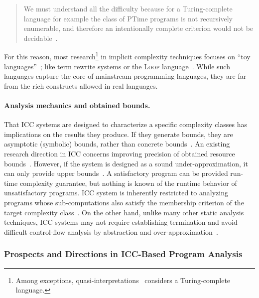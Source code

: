 \begin{quotation}
\noindent We must understand all the diﬃculty because for a Turing-complete language for example the class of PTime programs is not recursively enumerable, and therefore an intentionally complete criterion would not be decidable~\cite[Sect. 4.1]{mogbil2012}.
\end{quotation}

\noindent For this reason, most research\footnote{
Among exceptions, quasi-interpretations~\cite{marion2000} considers a Turing-complete language.}
in implicit complexity techniques focuses on \enquote{toy languages}~\cite{moyen2017,rubiano17};
like term rewrite systems or the \textsc{Loop} language~\cite{kristiansen2005}.
While such languages capture the core of mainstream programming languages, they are far from the rich constructs allowed in real languages.

\paragraph*{Analysis mechanics and obtained bounds.}
That ICC systems are designed to characterize a specific complexity classes has implications on the results they produce.
If they generate bounds, they are asymptotic (symbolic) bounds, rather than concrete bounds~\cite{baillot2019}.
An existing research direction in ICC concerns improving precision of obtained resource bounds~\cite{benamram2020}.
However, if the system is designed as a sound under-approximation, it can only provide upper bounds~\cite[p. 119]{moyen2017}.
A satisfactory program can be provided run-time complexity guarantee, but nothing is known of the runtime behavior of unsatisfactory programs.
ICC system is inherently restricted to analyzing programs whose sub-computations also satisfy the membership criterion of the target complexity class~\cite{baillot2019}.
On the other hand, unlike many other static analysis techniques,
ICC systems may not require establishing termination and avoid difficult control-flow analysis by abstraction and over-approximation~\cite{jones2009}.

\subsubsection{Prospects and Directions in ICC-Based Program Analysis}

